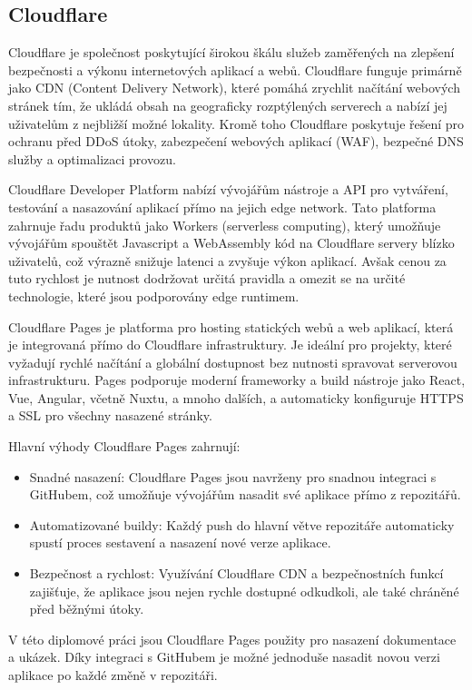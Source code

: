 \subsection{Cloudflare}
Cloudflare je společnost poskytující širokou škálu služeb zaměřených na zlepšení bezpečnosti a výkonu internetových aplikací a webů. Cloudflare funguje primárně jako CDN (Content Delivery Network), které pomáhá zrychlit načítání webových stránek tím, že ukládá obsah na geograficky rozptýlených serverech a nabízí jej uživatelům z nejbližší možné lokality. Kromě toho Cloudflare poskytuje řešení pro ochranu před DDoS útoky, zabezpečení webových aplikací (WAF), bezpečné DNS služby a optimalizaci provozu. \cite{Cloudflare}

Cloudflare Developer Platform nabízí vývojářům nástroje a API pro vytváření, testování a nasazování aplikací přímo na jejich edge network. Tato platforma zahrnuje řadu produktů jako Workers (serverless computing), který umožňuje vývojářům spouštět Javascript a WebAssembly kód na Cloudflare servery blízko uživatelů, což výrazně snižuje latenci a zvyšuje výkon aplikací. Avšak cenou za tuto rychlost je nutnost dodržovat určitá pravidla a omezit se na určité technologie, které jsou podporovány edge runtimem. \cite{CloudflareDeveloperPlatform}

Cloudflare Pages je platforma pro hosting statických webů a web aplikací, která je integrovaná přímo do Cloudflare infrastruktury. Je ideální pro projekty, které vyžadují rychlé načítání a globální dostupnost bez nutnosti spravovat serverovou infrastrukturu. Pages podporuje moderní frameworky a build nástroje jako React, Vue, Angular, včetně Nuxtu, a mnoho dalších, a automaticky konfiguruje HTTPS a SSL pro všechny nasazené stránky. \cite{CloudflarePages}

Hlavní výhody Cloudflare Pages zahrnují:

\begin{itemize}
    \item Snadné nasazení: Cloudflare Pages jsou navrženy pro snadnou integraci s GitHubem, což umožňuje vývojářům nasadit své aplikace přímo z repozitářů.
    \item Automatizované buildy: Každý push do hlavní větve repozitáře automaticky spustí proces sestavení a nasazení nové verze aplikace.
    \item Bezpečnost a rychlost: Využívání Cloudflare CDN a bezpečnostních funkcí zajišťuje, že aplikace jsou nejen rychle dostupné odkudkoli, ale také chráněné před běžnými útoky.
\end{itemize}

V této diplomové práci jsou Cloudflare Pages použity pro nasazení dokumentace a ukázek. Díky integraci s GitHubem je možné jednoduše nasadit novou verzi aplikace po každé změně v repozitáři.
